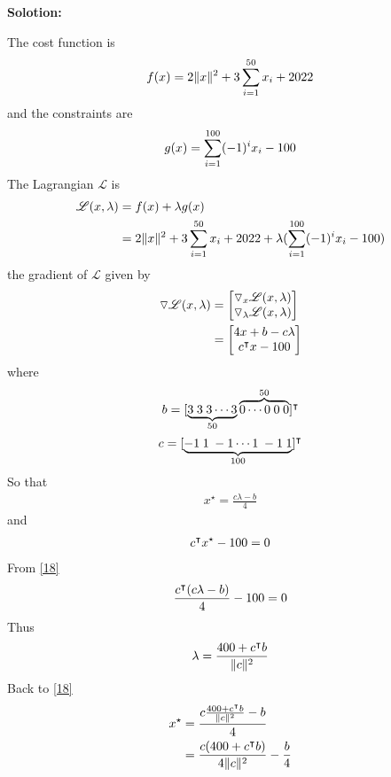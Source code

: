 \documentclass[a4paper,11pt,reqno]{amsart}
\newcommand{\tran}{\intercal}
\begin{document}
\textbf{Solotion:}

The cost function is
\begin{align}
f(x)=2\|x\|^2+3\sum_{i=1}^{50} x_i+2022 \notag
\end{align}
and the  constraints are 
\begin{align}
    g(x)=\sum_{i=1}^{100}(-1)^ix_i-100 \notag
\end{align}
The Lagrangian $\mathscr{L}$ is 
\begin{align}
    \mathscr{L}(x,\lambda)&=f(x)+\lambda g(x) \notag
    \\
    &=2\|x\|^2+3\sum_{i=1}^{50} x_i+2022+\lambda(\sum_{i=1}^{100}(-1)^ix_i-100)   \notag
\end{align}
the gradient of $\mathscr{L}$ given by
\begin{align}
    \triangledown\mathscr{L}(x,\lambda)&=\begin{bmatrix} \triangledown_x\mathscr{L}(x,\lambda)  \\ \triangledown_\lambda\mathscr{L}(x,\lambda) \end{bmatrix} \notag
    \\
    &=\begin{bmatrix} 4x+b -c\lambda \\ c^{\tran}x-100 \end{bmatrix} \notag
\end{align}
where 
$$
b=
    [\underbrace {  3 \hspace{0.25em} 3 \hspace{0.25em} 3 \cdots 3}_{50} 
    \overbrace{0 \cdots 0 \hspace{0.25em} 0 \hspace{0.25em} 0  }^{50}  ]^{\tran}     
$$
$$
c=
[\underbrace {
     -1 \hspace{0.25em} 1 \hspace{0.25em} -1 \cdots 1 \hspace{0.25em} -1 \hspace{0.25em} 
    1         
} _{100} 
]
^{\tran}
$$
So that 
\begin{align}
    x^{\star}=\frac{c\lambda-b}{4}
    \label{18}
\end{align}
and 
\begin{align}
    c^{\tran}x^{\star}-100=0 \notag
\end{align}
From \ref{18}
\begin{align}
    \frac{c^{\tran}(c\lambda-b)}{4}-100=0 \notag
\end{align}
Thus
\begin{align}
    \lambda=\frac{400+c^{\tran}b}{\|c\|^{2}} \notag
\end{align}
Back to \ref{18}
\begin{align}
    x^{\star}&=\frac{c\frac{400+c^{\tran}b}{\|c\|^{2}}-b}{4} \notag
    \\
    &=\frac{c(400+c^{\tran}b)}{4\|c\|^{2}}-\frac{b}{4} \notag
\end{align}
\end{document}
